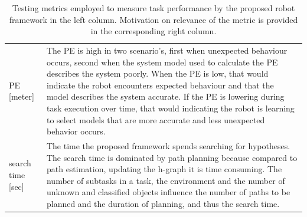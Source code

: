 \noindent
\begin{table}[H]
\caption{Testing metrics employed to measure task performance by the proposed robot framework in the left column. Motivation on relevance of the metric is provided in the corresponding right column.}\label{table:proposed_test_metrics}
\centering
\begin{tabular}%
  {>{\raggedright\arraybackslash}p{}%
   >{\raggedright\arraybackslash}p{}}
\acl{PE} [meter] &  The \ac{PE} is high in two scenario's, first when unexpected behaviour occurs, second when the system model used to calculate the \ac{PE} describes the system poorly. When the \ac{PE} is low, that would indicate the robot encounters expected behaviour and that the model describes the system accurate. If the \ac{PE} is lowering during task execution over time, that would indicating the robot is learning to select models that are more accurate and less unexpected behavior occurs.\\
search time [sec]& The time the proposed framework spends searching for hypotheses. The search time is dominated by path planning because compared to path estimation, updating the \ac{h-graph} it is time consuming. The number of subtasks in a task, the environment and the number of unknown and classified objects influence the number of paths to be planned and the duration of planning, and thus the search time.\\ 

\end{tabular}
\end{table}
